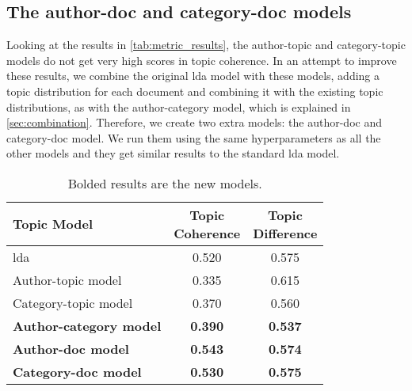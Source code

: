 \subsection{The author-doc and category-doc models}\label{subsec:app_exten_models}
Looking at the results in \autoref{tab:metric_results}, the author-topic and category-topic models do not get very high scores in topic coherence.
In an attempt to improve these results, we combine the original \gls{lda} model with these models, adding a topic distribution for each document and combining it with the existing topic distributions, as with the author-category model, which is explained in \autoref{sec:combination}.
Therefore, we create two extra models: the author-doc and category-doc model.
We run them using the same hyperparameters as all the other models and they get similar results to the standard \gls{lda} model.

\begin{table}[h]
	\centering
	\caption{Bolded results are the new models.}
	\begin{tabular}{l|c|c}
		Topic Model & \makecell{Topic \\ Coherence} & \makecell{Topic \\ Difference} \\
		\midrule
		\Acrlong{lda} & 0.520 & 0.575 \\
		Author-topic model & 0.335 & 0.615 \\
		Category-topic model & 0.370 & 0.560 \\
		\textbf{Author-category model} & \textbf{0.390} & \textbf{0.537} \\
		\textbf{Author-doc model} & \textbf{0.543} & \textbf{0.574} \\
		\textbf{Category-doc model} &\textbf{ 0.530} & \textbf{0.575} \\
	\end{tabular}
	\label{tab:_extra_metric_results}
\end{table}

